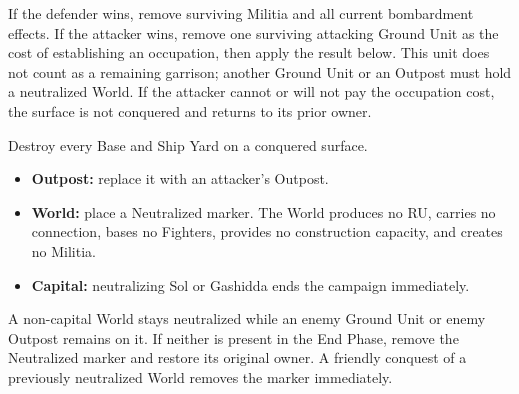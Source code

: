 If the defender wins, remove surviving Militia and all current bombardment
effects. If the attacker wins, remove one surviving attacking Ground Unit as
the cost of establishing an occupation, then apply the result below. This unit
does not count as a remaining garrison; another Ground Unit or an Outpost must
hold a neutralized World. If the attacker cannot or will not pay the occupation
cost, the surface is not conquered and returns to its prior owner.

Destroy every Base and Ship Yard on a conquered surface.

\begin{itemize}
  \item \textbf{Outpost:} replace it with an attacker's Outpost.
  \item \textbf{World:} place a Neutralized marker. The World produces no RU,
    carries no connection, bases no Fighters, provides no construction
    capacity, and creates no Militia.
  \item \textbf{Capital:} neutralizing Sol or Gashidda ends the campaign
    immediately.
\end{itemize}

A non-capital World stays neutralized while an enemy Ground Unit or enemy
Outpost remains on it. If neither is present in the End Phase, remove the
Neutralized marker and restore its original owner. A friendly conquest of a
previously neutralized World removes the marker immediately.
